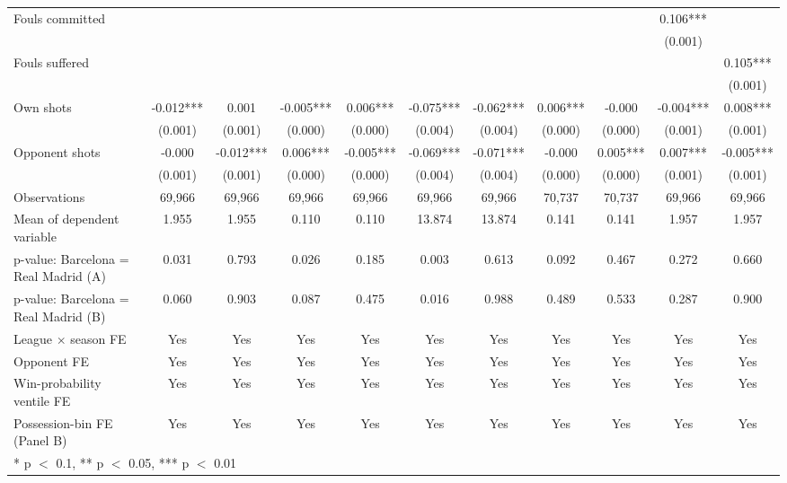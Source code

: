 \begin{table}[!h]
{\begin{threeparttable}
\begin{tabular}[t]{lcccccccccc}
\hspace{1em}Fouls committed &  &  &  &  &  &  &  &  & 0.106*** & \\
\hspace{1em} &  &  &  &  &  &  &  &  & (0.001) & \\
\hspace{1em}Fouls suffered &  &  &  &  &  &  &  &  &  & 0.105***\\
\hspace{1em} &  &  &  &  &  &  &  &  &  & (0.001)\\
\hspace{1em}Own shots & -0.012*** & 0.001 & -0.005*** & 0.006*** & -0.075*** & -0.062*** & 0.006*** & -0.000 & -0.004*** & 0.008***\\
\hspace{1em} & (0.001) & (0.001) & (0.000) & (0.000) & (0.004) & (0.004) & (0.000) & (0.000) & (0.001) & \vphantom{1} (0.001)\\
\hspace{1em}Opponent shots & -0.000 & -0.012*** & 0.006*** & -0.005*** & -0.069*** & -0.071*** & -0.000 & 0.005*** & 0.007*** & -0.005***\\
\hspace{1em} & (0.001) & (0.001) & (0.000) & (0.000) & (0.004) & (0.004) & (0.000) & (0.000) & (0.001) & (0.001)\\
\hspace{1em}Observations & 69,966 & 69,966 & 69,966 & 69,966 & 69,966 & 69,966 & 70,737 & 70,737 & 69,966 & 69,966\\
Mean of dependent variable & 1.955 & 1.955 & 0.110 & 0.110 & 13.874 & 13.874 & 0.141 & 0.141 & 1.957 & 1.957\\
p-value: Barcelona = Real Madrid (A) & 0.031 & 0.793 & 0.026 & 0.185 & 0.003 & 0.613 & 0.092 & 0.467 & 0.272 & 0.660\\
p-value: Barcelona = Real Madrid (B) & 0.060 & 0.903 & 0.087 & 0.475 & 0.016 & 0.988 & 0.489 & 0.533 & 0.287 & 0.900\\
League $\times$ season FE & Yes & Yes & Yes & Yes & Yes & Yes & Yes & Yes & Yes & Yes\\
Opponent FE & Yes & Yes & Yes & Yes & Yes & Yes & Yes & Yes & Yes & Yes\\
Win-probability ventile FE & Yes & Yes & Yes & Yes & Yes & Yes & Yes & Yes & Yes & Yes\\
Possession-bin FE (Panel B) & Yes & Yes & Yes & Yes & Yes & Yes & Yes & Yes & Yes & Yes\\
\bottomrule
\multicolumn{11}{l}{\rule{0pt}{1em}* p $<$ 0.1, ** p $<$ 0.05, *** p $<$ 0.01}\\

\end{tabular}
\end{threeparttable}}
\end{table}
